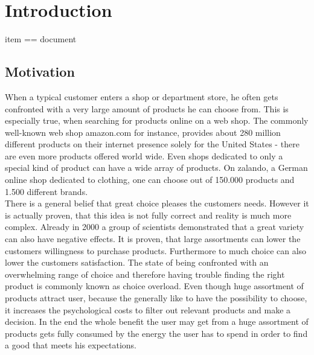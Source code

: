 
\section{Introduction}

{\color{red} item == document}

\subsection{Motivation}
When a typical customer enters a shop or department store, he often gets confronted with a very large amount of products he can choose from.
This is especially true, when searching for products online on a web shop.
The commonly well-known web shop \gls{amazon.com} for instance, provides about 280 million different products on their internet presence solely for the United States - there are even more products offered world wide.\citep{marketplaceanalytics:2014}
Even shops dedicated to only a special kind of product can have a wide array of products.
On \gls{zalando}, a German online shop dedicated to clothing, one can choose out of 150.000 products and 1.500 different brands.\citep{visser:2014}\\

There is a general belief that great choice pleases the customers needs.
However it is actually proven, that this idea is not fully correct and reality is much more complex.
Already in 2000 a group of scientists demonstrated that a great variety can also have negative effects.
It is proven, that large assortments can lower the customers willingness to purchase products.\citep[p.~312-313]{diehl:2010}
Furthermore to much choice can also lower the customers satisfaction.\citep[p.~320]{diehl:2010}
The state of being confronted with an overwhelming range of choice and therefore having trouble finding the right product is commonly known as choice overload.\citep[p.~454]{stanton:2012}
Even though huge assortment of products attract user, because the generally like to have the possibility to choose, it increases the psychological costs to filter out relevant products and make a decision.
In the end the whole benefit the user may get from a huge assortment of products gets fully consumed by the energy the user has to spend in order to find a good that meets his expectations.
\citep[p.~64]{bollen:2010}

